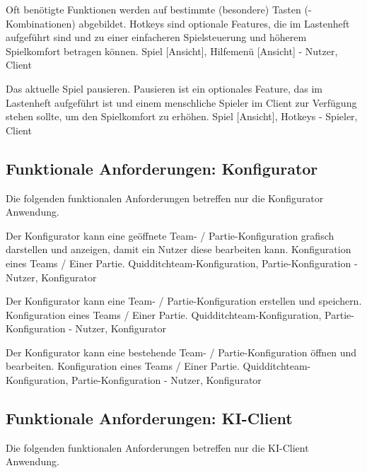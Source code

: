         {Oft benötigte Funktionen werden auf bestimmte (besondere) Tasten (-Kombinationen) abgebildet.}
        {Hotkeys sind optionale Features, die im Lastenheft aufgeführt sind und zu einer einfacheren Spielsteuerung und höherem Spielkomfort betragen können.}
        {Spiel [Ansicht], Hilfemenü [Ansicht]}
        {-}
        {Nutzer, Client}
        
        {Das aktuelle Spiel pausieren.}
        {Pausieren ist ein optionales Feature, das im Lastenheft aufgeführt ist und einem menschliche Spieler im Client zur Verfügung stehen sollte, um den Spielkomfort zu erhöhen.}
        {Spiel [Ansicht], Hotkeys}
        {-}
        {Spieler, Client}
        

\subsection{Funktionale Anforderungen: Konfigurator}
    
Die folgenden funktionalen Anforderungen betreffen nur die Konfigurator Anwendung.

        {Der Konfigurator kann eine geöffnete Team- / Partie-Konfiguration grafisch darstellen und anzeigen, damit ein Nutzer diese bearbeiten kann.}
        {Konfiguration eines Teams / Einer Partie.}
        {Quidditchteam-Konfiguration, Partie-Konfiguration}
        {-}
        {Nutzer, Konfigurator}	

        {Der Konfigurator kann eine Team- / Partie-Konfiguration erstellen und speichern.}
        {Konfiguration eines Teams / Einer Partie.}
        {Quidditchteam-Konfiguration, Partie-Konfiguration}
        {-}
        {Nutzer, Konfigurator}	

        {Der Konfigurator kann eine bestehende Team- / Partie-Konfiguration öffnen und bearbeiten.}
        {Konfiguration eines Teams / Einer Partie.}
        {Quidditchteam-Konfiguration, Partie-Konfiguration}
        {-}
        {Nutzer, Konfigurator}
        
\subsection{Funktionale Anforderungen: KI-Client}

Die folgenden funktionalen Anforderungen betreffen nur die KI-Client Anwendung.


